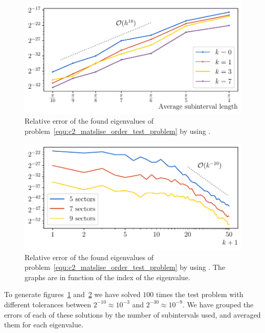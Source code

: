 \begin{figure}
    \begin{center}
        \includegraphics[width=\textwidth]{img/chapter2/matslise_h_error.pdf}
    \end{center}
    \caption{Relative error of the found eigenvalues of problem~\eqref{equ:c2_matslise_order_test_problem} by using .}
    \label{fig:c2_matslise_h_error}
\end{figure}

\begin{figure}
    \begin{center}
        \includegraphics[width=\textwidth]{img/chapter2/matslise_k_error.pdf}
    \end{center}
    \caption{Relative error of the found eigenvalues of problem~\eqref{equ:c2_matslise_order_test_problem} by using . The graphs are in function of the index of the eigenvalue.}
    \label{fig:c2_matslise_k_error}
\end{figure}

To generate figures~\ref{fig:c2_matslise_h_error} and~\ref{fig:c2_matslise_k_error} we have solved $100$ times the test problem with different tolerances between $2^{-10} \approx 10^{-3}$ and $2^{-30} \approx 10^{-9}$. We have grouped the errors of each of these solutions by the number of subintervals  used, and averaged them for each eigenvalue.

